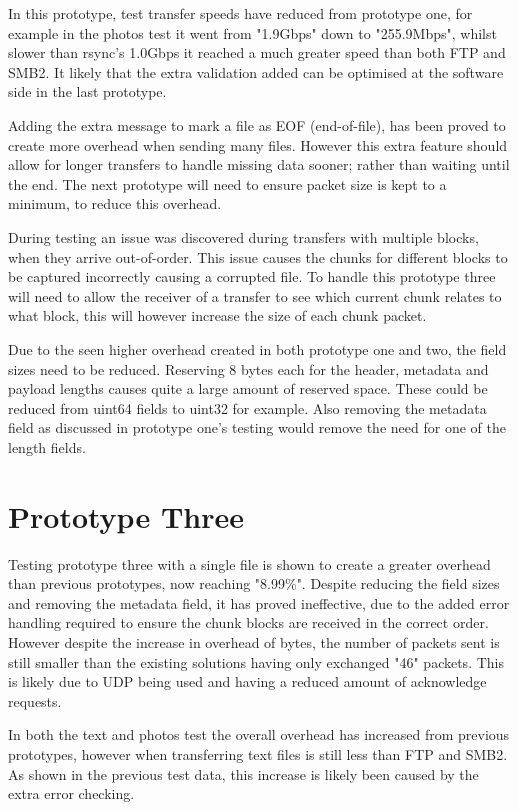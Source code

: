 In this prototype, test transfer speeds have reduced from prototype one, for example in the photos test it went from "1.9Gbps" down to "255.9Mbps", whilst slower than rsync's 1.0Gbps it reached a much greater speed than both FTP and SMB2. It likely that the extra validation added can be optimised at the software side in the last prototype.

Adding the extra message to mark a file as EOF (end-of-file), has been proved to create more overhead when sending many files. However this extra feature should allow for longer transfers to handle missing data sooner; rather than waiting until the end. The next prototype will need to ensure packet size is kept to a minimum, to reduce this overhead.

During testing an issue was discovered during transfers with multiple blocks, when they arrive out-of-order. This issue causes the chunks for different blocks to be captured incorrectly causing a corrupted file. To handle this prototype three will need to allow the receiver of a transfer to see which current chunk relates to what block, this will however increase the size of each chunk packet.

Due to the seen higher overhead created in both prototype one and two, the field sizes need to be reduced. Reserving 8 bytes each for the header, metadata and payload lengths causes quite a large amount of reserved space. These could be reduced from uint64 fields to uint32 for example. Also removing the metadata field as discussed in prototype one's testing would remove the need for one of the length fields.


\section{Prototype Three}
Testing prototype three with a single file is shown to create a greater overhead than previous prototypes, now reaching "8.99\%". Despite reducing the field sizes and removing the metadata field, it has proved ineffective, due to the added error handling required to ensure the chunk blocks are received in the correct order. However despite the increase in overhead of bytes, the number of packets sent is still smaller than the existing solutions having only exchanged "46" packets. This is likely due to UDP being used and having a reduced amount of acknowledge requests.

In both the text and photos test the overall overhead has increased from previous prototypes, however when transferring text files is still less than FTP and SMB2. As shown in the previous test data, this increase is likely been caused by the extra error checking.

